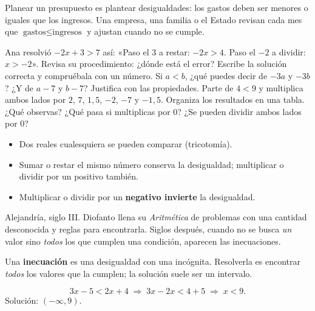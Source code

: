 \documentclass[11pt]{article}
\newcommand{\abierto}[1]{\draw[thick, fill=white] (#1,0) circle (3pt);}
\begin{document}
\begin{aplicacion}[Presupuestos]
Planear un presupuesto es plantear desigualdades: los gastos deben ser menores o
iguales que los ingresos. Una empresa, una familia o el Estado revisan cada mes
que $\text{gastos} \le \text{ingresos}$ y ajustan cuando no se cumple.
\end{aplicacion}

\begin{preguntas}
\pregunta Ana resolvió $-2x + 3 > 7$ así: «Paso el 3 a restar: $-2x > 4$. Paso el
$-2$ a dividir: $x > -2$». Revisa su procedimiento: ¿dónde está el error? Escribe
la solución correcta y compruébala con un número.
\pregunta Si $a < b$, ¿qué puedes decir de $-3a$ y $-3b$? ¿Y de $a - 7$ y $b - 7$?
Justifica con las propiedades.
\espacio{2.5cm}
\pregunta Parte de $4 < 9$ y multiplica ambos lados por $2$, $7$, $1{,}5$, $-2$,
$-7$ y $-1{,}5$. Organiza los resultados en una tabla. ¿Qué observas? ¿Qué pasa
si multiplicas por $0$? ¿Se pueden dividir ambos lados por $0$?
\espacio{3.5cm}
\end{preguntas}

\begin{resumen}
\begin{itemize}
  \item Dos reales cualesquiera se pueden comparar (tricotomía).
  \item Sumar o restar el mismo número conserva la desigualdad; multiplicar o
        dividir por un positivo también.
  \item Multiplicar o dividir por un \textbf{negativo invierte} la desigualdad.
\end{itemize}
\end{resumen}

\label{tema:lineales}

\begin{hilo}
Alejandría, siglo III. Diofanto llena su \emph{Aritmética} de problemas con una
cantidad desconocida y reglas para encontrarla. Siglos después, cuando no se busca
\emph{un} valor sino \emph{todos} los que cumplen una condición, aparecen las
inecuaciones.
\end{hilo}

Una \textbf{inecuación} es una desigualdad con una incógnita. Resolverla es
encontrar \emph{todos} los valores que la cumplen; la solución suele ser un
intervalo.

\begin{ejemplo}
\[
  3x - 5 < 2x + 4 \;\Longrightarrow\; 3x - 2x < 4 + 5 \;\Longrightarrow\; x < 9.
\]
Solución: $(-\infty, 9)$.
\begin{center}
\end{center}
\end{ejemplo}
\end{document}
